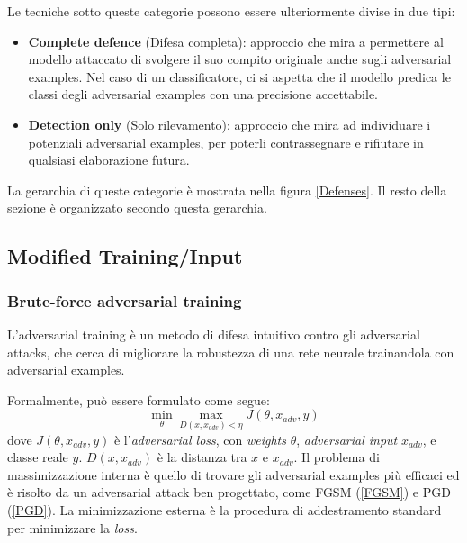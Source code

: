    Le tecniche sotto queste categorie possono essere ulteriormente divise in due tipi: 
        \begin{itemize}
            \item \textbf{Complete defence} (Difesa completa): approccio che mira a permettere al modello attaccato di svolgere il suo compito originale anche sugli adversarial examples. Nel caso di un classificatore, ci si aspetta che il modello predica le classi degli adversarial examples con una precisione accettabile.
            \item \textbf{Detection only} (Solo rilevamento): approccio che mira ad individuare i potenziali adversarial examples, per poterli contrassegnare e rifiutare in qualsiasi elaborazione futura.
        \end{itemize}
    La gerarchia di queste categorie è mostrata nella figura \ref{Defenses}.
    Il resto della sezione è organizzato secondo questa gerarchia.
    \newpage
    
    \subsection{Modified Training/Input}
    \label{BF Adversarial Training}    
        \subsubsection{Brute-force adversarial training}
        L'adversarial training %
        \cite{goodfellow2014explaining} è un metodo di difesa intuitivo contro gli adversarial attacks, che cerca di migliorare la robustezza di una rete neurale trainandola con adversarial examples.
        
        Formalmente, può essere formulato come segue:
            \begin{equation}
                \operatorname*{min}_{\theta} \operatorname*{max}_{D(x, x_{adv})<\eta}J(\theta,x_{adv},y)
            \end{equation}
        dove $J(\theta,x_{adv},y)$ è l'\textit{adversarial loss}, con \textit{weights} $\theta$, \textit{adversarial input} $x_{adv}$, e classe reale $y$. $D(x, x_{adv})$ è la distanza tra $x$ e $x_{adv}$.
        Il problema di massimizzazione interna è quello di trovare gli adversarial examples più efficaci ed è risolto da un adversarial attack ben progettato, come FGSM (\hyperref[FGSM]{\ref*{FGSM}}) e PGD (\hyperref[PGD]{\ref*{PGD}}).  
        La minimizzazione esterna è la procedura di addestramento standard per minimizzare la \textit{loss}. 
        
